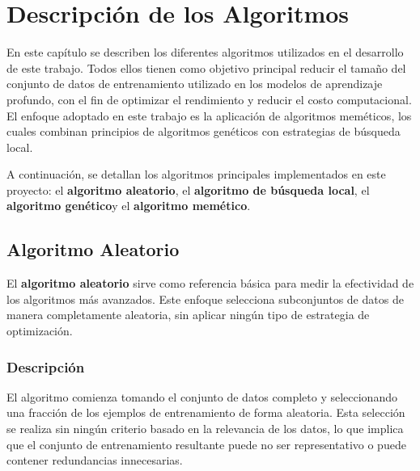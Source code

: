 
\chapter{Descripción de los Algoritmos}\label{ch:descripcion-algoritmos}
En este capítulo se describen los diferentes algoritmos utilizados en el desarrollo de este trabajo.
Todos ellos tienen como objetivo principal reducir el tamaño del conjunto de datos de entrenamiento utilizado en los
modelos de aprendizaje profundo, con el fin de optimizar el rendimiento y reducir el costo computacional.
El enfoque adoptado en este trabajo es la aplicación de algoritmos meméticos, los cuales combinan principios de
algoritmos genéticos con estrategias de búsqueda local.


A continuación, se detallan los algoritmos principales implementados en este proyecto: el \textbf{algoritmo aleatorio},
el \textbf{algoritmo de búsqueda local}, el \textbf{algoritmo genético}y el \textbf{algoritmo memético}.

\section{Algoritmo Aleatorio}\label{sec:algoritmo-aleatorio}
El \textbf{algoritmo aleatorio} sirve como referencia básica para medir la efectividad de los algoritmos más avanzados.
Este enfoque selecciona subconjuntos de datos de manera completamente aleatoria, sin aplicar ningún tipo de estrategia
de optimización.

\subsection{Descripción}\label{subsec:descripcion-aleatorio}
El algoritmo comienza tomando el conjunto de datos completo y seleccionando una fracción de los ejemplos de
entrenamiento de forma aleatoria.
Esta selección se realiza sin ningún criterio basado en la relevancia de los datos, lo que implica que el conjunto de
entrenamiento resultante puede no ser representativo o puede contener redundancias innecesarias.

